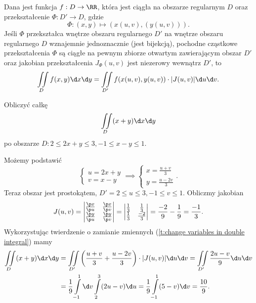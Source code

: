 \begin{theorem}
    \label{t:change variables in double integral}
    Dana jest funkcja $f : D \to \RR$, która jest ciągła na obszarze regularnym $D$ oraz przekształcenie $\varPhi : D' \to D$, gdzie
    \[ \varPhi : (x, y) \mapsto (x(u, v), (y(u, v))). \]
    Jeśli $\varPhi$ przekształca wnętrze obszaru regularnego $D'$ na wnętrze obszaru regularnego $D$ wznajemnie jednoznacznie (jest bijekcją), pochodne cząstkowe przekształcenia $\varPhi$ są ciągłe na pewnym zbiorze otwartym zawierającym obszar $D'$ oraz jakobian przekształcenia $J_\varPhi(u, v)$ jest niezerowy wewnątrz $D'$, to
    \[ \iint\limits_D f(x, y) \d x \d y = \iint\limits_{D'} f(x(u, v), y(u, v)) \cdot |J(u, v)| \d u \d v. \]
\end{theorem}

\begin{example}
    Obliczyć całkę
    \[ \iint\limits_D (x + y) \d x \d y \]
    po obszarze $D : 2 \leq 2x + y \leq 3, -1 \leq x - y \leq 1$.
\end{example}
\begin{solution}
    Możemy podstawić
    \[ \begin{cases} u = 2x + y \\ v = x - y \end{cases} \implies \begin{cases} x = \frac{u + v}{3} \\ y = \frac{u - 2v}{3} \end{cases}. \]
    Teraz obszar jest prostokątem, $D' = 2 \leq u \leq 3, -1 \leq v \leq 1$. Obliczmy jakobian
    \[ J(u, v) = \begin{vmatrix}
        \frac{\p x}{\p u} & \frac{\p x}{\p v} \\
        \frac{\p y}{\p u} & \frac{\p y}{\p v}
    \end{vmatrix} = \begin{vmatrix}
        \frac{1}{3} & \frac{1}{3} \\
        \frac{1}{3} & \frac{-2}{3}
    \end{vmatrix} = \frac{-2}{9} - \frac{1}{9} = \frac{-1}{3}. \]
    Wykorzystując twierdzenie o zamianie zmiennych (\ref{t:change variables in double integral}) mamy
    \begin{align*}
        \iint\limits_D (x + y) \d x \d y &= \iint\limits_{D'} \left(\frac{u + v}{3} + \frac{u - 2v}{3}\right) \cdot |J(u, v)| \d u \d v = \iint\limits_{D'} \frac{2u - v}{9} \d u \d v \\
        &= \frac{1}{9}\int\limits_{-1}^1 \d v \int\limits_2^3 (2u - v) \d u = \frac{1}{9}\int\limits_{-1}^1 (5 - v) \d v = \frac{10}{9}.
    \end{align*}
\end{solution}


